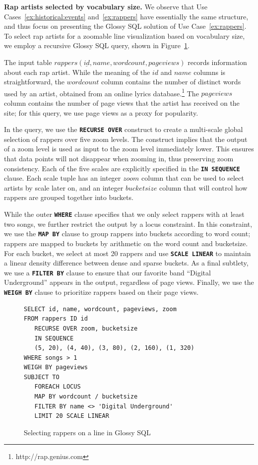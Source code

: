 \documentclass[11pt, oneside]{report}
\newcommand{\minisec}[1]{\noindent\textbf{#1.}}
\begin{document}
{\minisec{Rap artists selected by vocabulary size}
We observe that Use Cases~\ref{ex:historical:events} and~\ref{ex:rappers} have essentially the same structure, and thus focus on presenting the Glossy SQL solution of Use Case~\ref{ex:rappers}.
To select rap artists for a zoomable line visualization based on vocabulary size, we employ a recursive Glossy SQL query, shown in Figure~\ref{fig:glossy:sql:rappers}. 

The input table $rappers(\underline{id}, name, wordcount, pageviews)$ records information about each rap artist. While the meaning of the $id$ and $name$ columns is straightforward, the $wordcount$ column contains the number of distinct words used by an artist, obtained from an online lyrics database.\footnote{http://rap.genius.com} The $pageviews$ column contains the number of page views that the artist has received on the site; for this query, we use page views as a proxy for popularity.

In the query, we use the \textbf{\texttt{RECURSE OVER}} construct to create a multi-scale global selection of rappers over five zoom levels. The construct implies that the output of a zoom level is used as input to the zoom level immediately lower. This ensures that data points will not disappear when zooming in, thus preserving zoom consistency. Each of the five scales are explicitly specified in the \textbf{\texttt{IN SEQUENCE}} clause. Each scale tuple has an integer $zoom$ column that can be used to select artists by scale later on, and an integer $bucketsize$ column that will control how rappers are grouped together into buckets.

While the outer \textbf{\texttt{WHERE}} clause specifies that we only select rappers with at least two songs, we further restrict the output by a locus constraint. In this constraint, we use the \textbf{\texttt{MAP BY}} clause to group rappers into buckets according to word count; rappers are mapped to buckets by arithmetic on the word count and bucketsize. For each bucket, we select at most 20 rappers and use \textbf{\texttt{SCALE LINEAR}} to maintain a linear density difference between dense and sparse buckets. As a final subtlety, we use a \textbf{\texttt{FILTER BY}} clause to ensure that our favorite band ``Digital Underground''  appears in the output, regardless of page views. Finally, we use the \textbf{\texttt{WEIGH BY}} clause to prioritize rappers based on their page views. 

\begin{figure}[!t]
\begin{center}
\begin{lstlisting}
SELECT id, name, wordcount, pageviews, zoom
FROM rappers ID id
   RECURSE OVER zoom, bucketsize 
   IN SEQUENCE 
   (5, 20), (4, 40), (3, 80), (2, 160), (1, 320)
WHERE songs > 1
WEIGH BY pageviews
SUBJECT TO
   FOREACH LOCUS
   MAP BY wordcount / bucketsize
   FILTER BY name <> 'Digital Underground'
   LIMIT 20 SCALE LINEAR
\end{lstlisting}
\caption{Selecting rappers on a line in Glossy SQL}
\label{fig:glossy:sql:rappers}
\end{center}
\end{figure}

}
\end{document}
